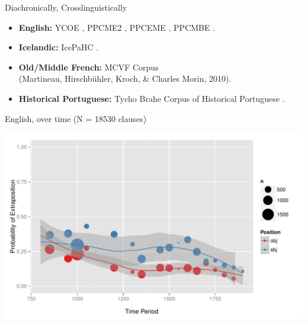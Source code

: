 \documentclass[hyperref={pdfpagelabels=false}]{beamer}
\begin{document}
\begin{frame}{Diachronically, Crosslinguistically}
\begin{itemize}
	\item \textbf{English:} YCOE \citep{ycoe}, PPCME2 \citep{ppcme2}, PPCEME \citep{ppceme}, PPCMBE \citep{ppcmbe}.
	\item \textbf{Icelandic:} IcePaHC \citep{icepahc09}.
	\item \textbf{Old/Middle French:} MCVF Corpus \\(Martineau, Hirschbühler, Kroch, \& Charles Morin, 2010)\nocite{mcvf}.
	\item \textbf{Historical Portuguese:} Tycho Brahe Corpus of Historical Portuguese \citep{tychobrahe}.
	\end{itemize}

\end{frame}

\begin{frame}{English, over time (N = 18530 clauses)}

\begin{center}
\includegraphics[width=1.1\textwidth]{exSbjObjYearBinned50Loessymeb.pdf}
\end{center}
\end{frame}
\end{document}

